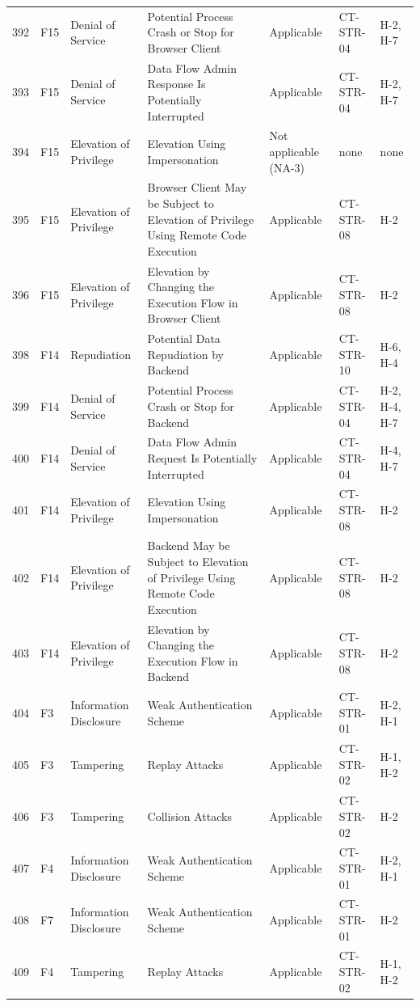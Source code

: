 \begin{footnotesize}
\begin{longtable}{l l p{} p{} p{} l p{}}
        392 & F15 & Denial of Service & Potential Process Crash or Stop for Browser Client & Applicable & CT-STR-04 & H-2, H-7 \\
        393 & F15 & Denial of Service & Data Flow Admin Response Is Potentially Interrupted & Applicable & CT-STR-04 & H-2, H-7 \\
        394 & F15 & Elevation of Privilege & Elevation Using Impersonation & Not applicable (NA-3) & none & none \\
        395 & F15 & Elevation of Privilege & Browser Client May be Subject to Elevation of Privilege Using Remote Code Execution & Applicable & CT-STR-08 & H-2 \\
        396 & F15 & Elevation of Privilege & Elevation by Changing the Execution Flow in Browser Client & Applicable & CT-STR-08 & H-2 \\
        398 & F14 & Repudiation & Potential Data Repudiation by Backend & Applicable & CT-STR-10 & H-6, H-4 \\
        399 & F14 & Denial of Service & Potential Process Crash or Stop for Backend & Applicable & CT-STR-04 & H-2, H-4, H-7 \\
        400 & F14 & Denial of Service & Data Flow Admin Request Is Potentially Interrupted & Applicable & CT-STR-04 & H-4, H-7 \\
        401 & F14 & Elevation of Privilege & Elevation Using Impersonation & Applicable & CT-STR-08 & H-2 \\
        402 & F14 & Elevation of Privilege & Backend May be Subject to Elevation of Privilege Using Remote Code Execution & Applicable & CT-STR-08 & H-2 \\
        403 & F14 & Elevation of Privilege & Elevation by Changing the Execution Flow in Backend & Applicable & CT-STR-08 & H-2 \\
        404 & F3 & Information Disclosure & Weak Authentication Scheme & Applicable & CT-STR-01 & H-2, H-1 \\
        405 & F3 & Tampering & Replay Attacks & Applicable & CT-STR-02 & H-1, H-2 \\
        406 & F3 & Tampering & Collision Attacks & Applicable & CT-STR-02 & H-2 \\
        407 & F4 & Information Disclosure & Weak Authentication Scheme & Applicable & CT-STR-01 & H-2, H-1 \\
        408 & F7 & Information Disclosure & Weak Authentication Scheme & Applicable & CT-STR-01 & H-2 \\
        409 & F4 & Tampering & Replay Attacks & Applicable & CT-STR-02 & H-1, H-2 \\

\end{longtable}
\end{footnotesize}
